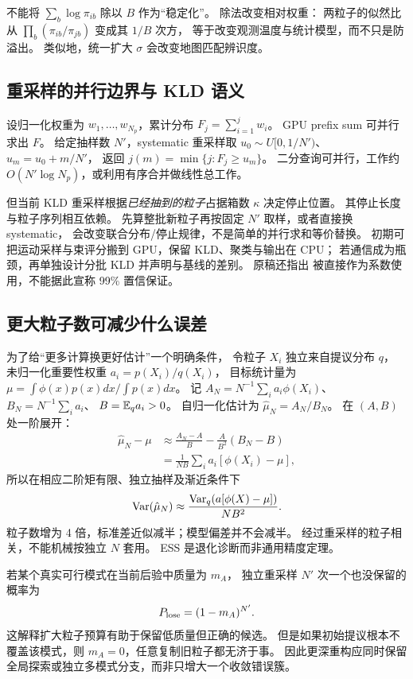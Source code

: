 不能将 $\sum_b\log\pi_{ib}$ 除以 $B$ 作为“稳定化”。
除法改变相对权重：
两粒子的似然比从 $\prod_b(\pi_{ib}/\pi_{jb})$ 变成其 $1/B$ 次方，
等于改变观测温度与统计模型，而不只是防溢出。
类似地，统一扩大 $\sigma$ 会改变地图匹配辨识度。

\subsection{重采样的并行边界与 KLD 语义}
设归一化权重为 $w_1,\dots,w_{N_p}$，累计分布
$F_j=\sum_{i=1}^jw_i$。
GPU prefix sum 可并行求出 $F$。
给定抽样数 $N'$，systematic 重采样取
$u_0\sim U[0,1/N')$、$u_m=u_0+m/N'$，
返回 $j(m)=\min\{j:F_j\ge u_m\}$。
二分查询可并行，工作约 $O(N'\log N_p)$，或利用有序合并做线性总工作。

但当前 KLD 重采样根据\emph{已经抽到的粒子}占据箱数 $\kappa$ 决定停止位置。
其停止长度与粒子序列相互依赖。
先算整批新粒子再按固定 $N'$ 取样，或者直接换 systematic，
会改变联合分布/停止规律，不是简单的并行求和等价替换。
初期可把运动采样与束评分搬到 GPU，保留 KLD、聚类与输出在 CPU；
若通信成为瓶颈，再单独设计分批 KLD 并声明与基线的差别。
原稿还指出  被直接作为系数使用，不能据此宣称 99\% 置信保证。

\subsection{更大粒子数可减少什么误差}
为了给“更多计算换更好估计”一个明确条件，
令粒子 $X_i$ 独立来自提议分布 $q$，
未归一化重要性权重 $a_i=p(X_i)/q(X_i)$，
目标统计量为
$\mu=\int\phi(x)p(x)dx/\int p(x)dx$。
记
$A_N=N^{-1}\sum_i a_i\phi(X_i)$、
$B_N=N^{-1}\sum_i a_i$、
$B=\mathbb E_q a_i>0$。
自归一化估计为 $\hat\mu_N=A_N/B_N$。
在 $(A,B)$ 处一阶展开：
\begin{align}
\hat\mu_N-\mu
&\approx\frac{A_N-A}{B}
-\frac{A}{B^2}(B_N-B)\\
&=\frac1{NB}\sum_i a_i[\phi(X_i)-\mu],
\end{align}
所以在相应二阶矩有限、独立抽样及渐近条件下
\begin{equation}
\operatorname{Var}(\hat\mu_N)\approx
\frac{\operatorname{Var}_q(a[\phi(X)-\mu])}{NB^2}.
\label{eq:snis}
\end{equation}
粒子数增为 4 倍，标准差近似减半；模型偏差并不会减半。
经过重采样的粒子相关，不能机械按独立 $N$ 套用。
ESS 是退化诊断而非通用精度定理。

若某个真实可行模式在当前后验中质量为 $m_A$，
独立重采样 $N'$ 次一个也没保留的概率为
\[
P_{\rm lose}=(1-m_A)^{N'}.
\]
这解释扩大粒子预算有助于保留低质量但正确的候选。
但是如果初始提议根本不覆盖该模式，则 $m_A=0$，任意复制旧粒子都无济于事。
因此更深重构应同时保留全局探索或独立多模式分支，而非只增大一个收敛错误簇。

